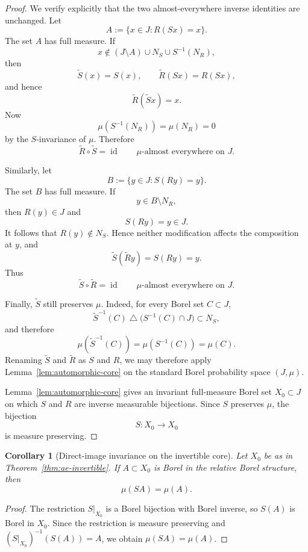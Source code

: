 \documentclass[11pt]{amsart}
\theoremstyle{plain}
\newtheorem{corollary}[theorem]{Corollary}
\theoremstyle{definition}
\theoremstyle{remark}
\begin{document}
\begin{proof}
We verify explicitly that the two almost-everywhere inverse identities
are unchanged. Let
\[
        A
        :=
        \{x\in J:R(Sx)=x\}.
\]
The set \(A\) has full measure. If
\[
        x\notin
        (J\setminus A)\cup N_S\cup S^{-1}(N_R),
\]
then
\[
        \widetilde S(x)=S(x),
        \qquad
        \widetilde R(Sx)=R(Sx),
\]
and hence
\[
        \widetilde R(\widetilde Sx)=x.
\]
Now
\[
        \mu(S^{-1}(N_R))=\mu(N_R)=0
\]
by the \(S\)-invariance of \(\mu\). Therefore
\[
        \widetilde R\circ\widetilde S
        =
        \operatorname{id}
        \qquad
        \mu\text{-almost everywhere on }J.
\]

Similarly, let
\[
        B
        :=
        \{y\in J:S(Ry)=y\}.
\]
The set \(B\) has full measure. If
\[
        y\in B\setminus N_R,
\]
then \(R(y)\in J\) and
\[
        S(Ry)=y\in J.
\]
It follows that \(R(y)\notin N_S\). Hence neither modification affects
the composition at \(y\), and
\[
        \widetilde S(\widetilde Ry)
        =
        S(Ry)
        =
        y.
\]
Thus
\[
        \widetilde S\circ\widetilde R
        =
        \operatorname{id}
        \qquad
        \mu\text{-almost everywhere on }J.
\]

Finally, \(\widetilde S\) still preserves \(\mu\). Indeed, for every
Borel set \(C\subset J\),
\[
        \widetilde S^{-1}(C)
        \mathbin{\triangle}
        \bigl(S^{-1}(C)\cap J\bigr)
        \subset N_S,
\]
and therefore
\[
        \mu(\widetilde S^{-1}(C))
        =
        \mu(S^{-1}(C))
        =
        \mu(C).
\]
Renaming \(\widetilde S\) and \(\widetilde R\) as \(S\) and \(R\), we
may therefore apply Lemma~\ref{lem:automorphic-core} on the standard
Borel probability space \((J,\mu)\).

Lemma~\ref{lem:automorphic-core} gives an invariant full-measure Borel
set \(X_0\subset J\) on which \(S\) and \(R\) are inverse measurable
bijections. Since \(S\) preserves \(\mu\), the bijection
\[
        S:X_0\longrightarrow X_0
\]
is measure preserving.
\end{proof}

\begin{corollary}[Direct-image invariance on the invertible core]\label{cor:direct-core}
Let $X_0$ be as in Theorem~\ref{thm:ae-invertible}. If $A\subset X_0$ is Borel in the relative Borel structure, then
\[
        \mu(SA)=\mu(A).
\]
\end{corollary}

\begin{proof}
The restriction \(S|_{X_0}\) is a Borel bijection with Borel inverse, so \(S(A)\) is
Borel in \(X_0\). Since the restriction is measure preserving and
\((S|_{X_0})^{-1}(S(A))=A\), we obtain \(\mu(SA)=\mu(A)\).
\end{proof}
\end{document}
